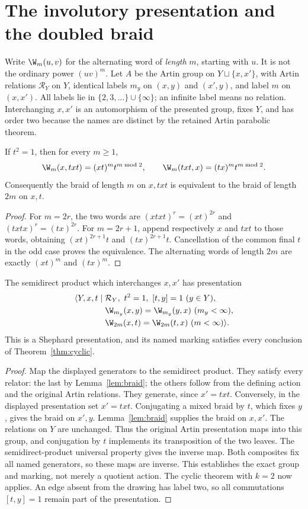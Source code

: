 \section{The involutory presentation and the doubled braid}
Write $\W_m(u,v)$ for the alternating word of \emph{length} $m$,
starting with $u$. It is not the ordinary power $(uv)^m$.
Let $A$ be the Artin group on $Y\sqcup\{x,x'\}$, with Artin
relations $\mathcal R_Y$ on $Y$, identical labels $m_y$ on
$(x,y)$ and $(x',y)$, and label $m$ on $(x,x')$.
All labels lie in $\{2,3,\ldots\}\cup\{\infty\}$; an infinite
label means no relation. Interchanging $x,x'$ is an automorphism of
the presented group, fixes $Y$, and has order two because the names
are distinct by the retained Artin parabolic theorem.

\begin{lemma}\label{lem:braid}
If $t^2=1$, then for every $m\geq1$,
\[
 \W_m(x,txt)=(xt)^m t^{m\bmod2},\qquad
 \W_m(txt,x)=(tx)^m t^{m\bmod2}.
\]
Consequently the braid of length $m$ on $x,txt$ is equivalent to the
braid of length $2m$ on $x,t$.
\end{lemma}
\begin{proof}
For $m=2r$, the two words are $(xtxt)^r=(xt)^{2r}$ and
$(txtx)^r=(tx)^{2r}$. For $m=2r+1$, append respectively $x$ and
$txt$ to those words, obtaining $(xt)^{2r+1}t$ and
$(tx)^{2r+1}t$. Cancellation of the common final $t$ in the odd case
proves the equivalence. The alternating words of length $2m$ are
exactly $(xt)^m$ and $(tx)^m$.
\end{proof}

\begin{theorem}\label{thm:fold}
The semidirect product which interchanges $x,x'$ has presentation
\begin{align*}
 \langle Y,x,t\mid {}&\mathcal R_Y,\ t^2=1,\ [t,y]=1\ (y\in Y),\\
 &\W_{m_y}(x,y)=\W_{m_y}(y,x)\ (m_y<\infty),\\
 &\W_{2m}(x,t)=\W_{2m}(t,x)\ (m<\infty)\rangle.
\end{align*}
This is a Shephard presentation, and its named marking satisfies every
conclusion of Theorem~\ref{thm:cyclic}.
\end{theorem}
\begin{proof}
Map the displayed generators to the semidirect product. They satisfy
every relator: the last by Lemma~\ref{lem:braid}; the others follow
from the defining action and the original Artin relations. They generate,
since $x'=txt$. Conversely, in the displayed presentation set
$x'=txt$. Conjugating a mixed braid by $t$, which fixes $y$, gives
the braid on $x',y$. Lemma~\ref{lem:braid} supplies the braid on
$x,x'$. The relations on $Y$ are unchanged. Thus the original Artin
presentation maps into this group, and conjugation by $t$ implements
its transposition of the two leaves. The semidirect-product universal
property gives the inverse map. Both composites fix all named
 generators, so these maps are inverse. This establishes the exact
 group and marking, not merely a quotient action. The cyclic theorem
with $k=2$ now applies. An edge absent from the drawing has label two,
so all commutations $[t,y]=1$ remain part of the presentation.
\end{proof}


